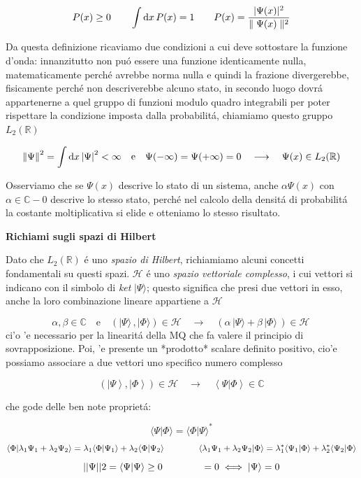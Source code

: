 \begin{equation}
	P(x)\geq0 \qquad \int{\rm d}x\,P(x)=1\qquad P(x)=\frac{|\Psi(x)|^{2}}{\parallel\Psi(x)\parallel^{2}}
\end{equation}

Da questa definizione ricaviamo due condizioni a cui deve sottostare la funzione d'onda: innanzitutto non pu\'o essere una funzione identicamente nulla, matematicamente perch\'e avrebbe norma nulla e quindi la frazione divergerebbe, fisicamente perch\'e non descriverebbe alcuno stato, in secondo luogo dovr\'a appartenerne a quel gruppo di funzioni modulo quadro integrabili per poter rispettare la condizione imposta dalla probabilit\'a, chiamiamo questo gruppo $L_2(\mathbb{R})$

\begin{equation}
	\left\|\Psi\right\|^{2}=\int{\rm d}x\left|\Psi\right|^{2}<\infty\quad\text{e} \quad\Psi(-\infty)=\Psi(+\infty)=0\quad\longrightarrow\quad\Psi(x)\in L_{2}(\mathbb{R})
\end{equation}

Osserviamo che se $\Psi(x)$ descrive lo stato di un sistema, anche $\alpha\Psi(x)$ con $\alpha \in \mathbb{C} - {0}$ descrive lo stesso stato, perch\'e nel calcolo della densit\'a di probabilit\'a la costante moltiplicativa si elide e otteniamo lo stesso risultato.


\textbf{Richiami sugli spazi di Hilbert}

Dato che $L_2(\mathbb{R})$ \'e uno \textit{spazio di Hilbert}, richiamiamo alcuni concetti fondamentali su questi spazi. $\mathcal{H}$ \'e uno \textit{spazio vettoriale complesso}, i cui vettori si indicano con il simbolo di \textit{ket} $|\Psi\rangle$; questo significa che presi due vettori in esso, anche la loro combinazione lineare appartiene a $\mathcal{H}$

$$\alpha,\beta\in\mathbb{C}\quad \text{e}\quad(|\Psi\rangle\,,|\Phi\rangle)\in\mathcal{H}\quad\longrightarrow\quad(\alpha\,|\Psi\rangle+\beta\,|\Phi\rangle\,)\in\mathcal{H}\,$$
ci'o 'e necessario per la linearit\'a della MQ che fa valere il principio di sovrapposizione. Poi, 'e presente un *prodotto* scalare definito positivo, cio'e possiamo associare a due vettori uno specifico numero complesso

$$(\left|\Psi\right\rangle,\left|\Phi\right\rangle)\in{\mathcal{H}}\quad\longrightarrow\quad\left\langle\Psi|\Phi\right\rangle\in{\mathbb{C}}$$

che gode delle ben note propriet\'a:

$$\langle\Psi|\Phi\rangle=\langle\Phi|\Psi\rangle^{*}$$
$$\braket{\Phi}{\lambda_{1}\Psi_1 + \lambda_{2}\Psi_2} = \lambda_{1}\braket{\Phi}{\Psi_{1}} + \lambda_{2}\braket{\Phi}{\Psi_{2}} \qquad\qquad 
\braket{\lambda_{1}\Psi_{1} + \lambda_{2}\Psi_{2}}{\Phi} = \lambda_{1}^* \braket{\Psi_{1}}{\Phi} + \lambda_{2}^* \braket{\Psi_{2}}{\Phi}$$
$$||\Psi||2 = \braket{\Psi}{\Psi} \geq 0 \qquad\qquad = 0 \iff \ket{\Psi} = 0$$

